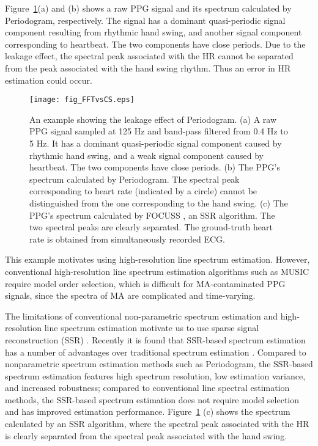 \documentclass[10pt,twocolumn]{IEEEtran}
\begin{document}
Figure~\ref{fig:FFTvsCS}(a) and (b) shows a raw PPG signal and its spectrum calculated by Periodogram, respectively. The signal has a dominant quasi-periodic signal component resulting from rhythmic hand swing, and another signal component corresponding to heartbeat. The two components have close periods. Due to the leakage effect, the spectral peak associated with the HR cannot be separated from the  peak associated with the hand swing rhythm. Thus an error in HR estimation could occur.




\begin{figure}[t]
\centering
\texttt{[image: fig\_FFTvsCS.eps]}
\caption{An example showing the leakage effect of Periodogram. (a) A raw PPG signal sampled at 125 Hz and band-pass filtered from 0.4 Hz to 5 Hz. It has a dominant quasi-periodic signal component caused by rhythmic hand  swing, and a weak signal component caused by heartbeat. The two components have close periods. (b) The PPG's spectrum calculated by Periodogram. The spectral peak corresponding to heart rate (indicated by a circle) cannot be distinguished from the one corresponding to the hand swing. (c) The PPG's spectrum calculated by FOCUSS \cite{Gorodnitsky1997}, an SSR algorithm. The two spectral peaks are clearly separated. The ground-truth heart rate is obtained from simultaneously recorded ECG. }
\label{fig:FFTvsCS}
\end{figure}

This example motivates using high-resolution line spectrum estimation. However, conventional high-resolution line spectrum estimation algorithms such as MUSIC require model order selection, which is difficult for MA-contaminated PPG signals, since the spectra of MA are complicated and time-varying.


The limitations of  conventional non-parametric spectrum estimation and high-resolution line spectrum estimation motivate us to   use   sparse signal reconstruction (SSR) \cite{Gorodnitsky1997,Donoho2006compressed,Eladbook}. Recently it is found that SSR-based spectrum estimation has a number of advantages over traditional spectrum estimation \cite{duarte2013spectral}. Compared to  nonparametric spectrum estimation methods such as Periodogram,  the SSR-based spectrum estimation features high spectrum resolution, low estimation variance, and increased robustness; compared to conventional line spectral estimation methods, the SSR-based spectrum estimation does not require model selection and has improved estimation performance. Figure~\ref{fig:FFTvsCS} (c) shows the spectrum calculated by an SSR algorithm, where the spectral peak associated with the HR is clearly separated from the spectral peak associated with the hand swing.
\end{document}
